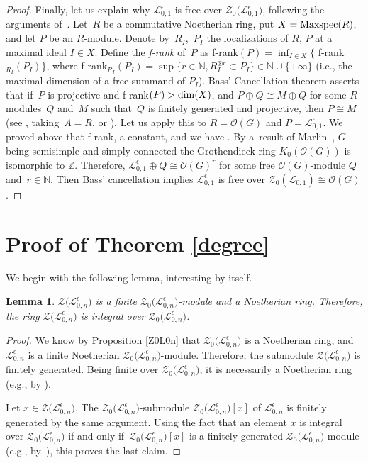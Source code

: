 \documentclass[pdftex]{sigma}
\numberwithin{equation}{section}
\newtheorem{lem}[teo]{Lemma}
\theoremstyle{definition}
\newcommand{\e}{\epsilon}
\newcommand{\mz}{\mathbb{Z}}
\newcommand{\mn}{\mathbb{N}}
\newcommand{\Ll}{{\mathcal L}}
\newcommand{\Oo}{{\mathcal O}}
\begin{document}
\begin{proof}
Finally, let us explain why $\Ll_{0,1}^\e$ is free over $\mathcal{Z}_0\bigl(\Ll_{0,1}^\e\bigr)$, following the arguments of~\cite{BGS}. Let~$R$ be a commutative Noetherian ring, put $X={\rm Maxspec}(R)$, and let $P$ be an $R$-module. Denote by~$R_I$,~$P_I$ the localizations of $R$, $P$ at a maximal ideal $I\in X$. Define the {\it f-rank} of~$P$ as f-rank$ (P) = \inf_{I\in X} \{$ f-rank${}_{R_I}(P_I)\}$, where f-rank${{}_{R_I}(P_I) = \sup\bigl\{ r\in \mathbb{N}, R_I^{\otimes r}\subset P_I\bigr\}\in \mn\cup\{+\infty\}}$ (i.e., the maximal dimension of a free summand of $P_I$). Bass' Cancellation theorem asserts that if~$P$ is projective and f-rank$(P)> {\rm dim}(X)$, and $P\oplus Q \cong M\oplus Q$ for some $R$-modules~$Q$ and~$M$ such that~$Q$ is finitely generated and projective, then $P\cong M$ (see \cite[Section~IV.3.5, p.~167 and~p.~170]{Bass}, taking~${A=R}$, or \cite[Section~11.7.13]{MC-R}). Let us apply this to ${R=\Oo(G)}$ and $P=\Ll_{0,1}^\e$. We proved above that f-rank, a constant, and we have . By a~result of Marlin~\cite{Marlin}, $G$ being semisimple and simply connected the Grothendieck ring $K_0(\Oo(G)\!)$ is isomorphic to $\mz$. Therefore, $\Ll_{0,1}^\e\oplus Q \cong \Oo(G)^r$ for some free $\Oo(G)$-module $Q$ and~${r\in \mathbb{N}}$. Then Bass' cancellation implies $\Ll_{0,1}^\e$ is free over $\mathcal{Z}_0(\Ll_{0,1})\cong \Oo(G)$.
\end{proof}

\section{Proof of Theorem \ref{degree}}\label{DEGREEsec}
We begin with the following lemma, interesting by itself.
\begin{lem}\label{ZfiniteZ0} $\mathcal{Z}\bigl(\Ll_{0,n}^\e\bigr)$ is a finite $\mathcal{Z}_0\bigl(\Ll_{0,n}^\e\bigr)$-module and a Noetherian ring. Therefore, the ring $\mathcal{Z}\bigl(\Ll_{0,n}^\e\bigr)$ is integral over $\mathcal{Z}_0\bigl(\Ll_{0,n}^\e\bigr)$.
\end{lem}
\begin{proof} We know by Proposition \ref{Z0L0n} that $\mathcal{Z}_0\bigl(\Ll_{0,n}^\e\bigr)$ is a Noetherian ring, and $\Ll_{0,n}^\e$ is a finite Noetherian $\mathcal{Z}_0\bigl(\Ll_{0,n}^\e\bigr)$-module. Therefore, the submodule $\mathcal{Z}\bigl(\Ll_{0,n}^\e\bigr)$ is finitely generated. Being finite over $\mathcal{Z}_0\bigl(\Ll_{0,n}^\e\bigr)$, it is necessarily a Noetherian ring (e.g., by \cite[Proposition~7.2]{AM}).

Let $x\in \mathcal{Z}\bigl(\Ll_{0,n}^\e\bigr)$. The $\mathcal{Z}_0\bigl(\Ll_{0,n}^\e\bigr)$-submodule $\mathcal{Z}_0\bigl(\Ll_{0,n}^\e\bigr)[x]$ of $\Ll_{0,n}^\e$ is finitely generated by the same argument. Using the fact that an element $x$ is integral over $\mathcal{Z}_0\bigl(\Ll_{0,n}^\e\bigr)$ if and only if~${\mathcal{Z}_0\bigl(\Ll_{0,n}^\e\bigr)[x]}$ is a finitely generated $\mathcal{Z}_0\bigl(\Ll_{0,n}^\e\bigr)$-module (e.g., by~\cite[Proposition 5.1]{AM}), this proves the last claim.
\end{proof}
\end{document}
